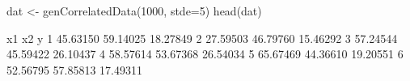 \begin{Schunk}
\begin{Sinput}
 dat <- genCorrelatedData(1000, stde=5)
 head(dat)
\end{Sinput}
\begin{Soutput}
        x1       x2        y
1 45.63150 59.14025 18.27849
2 27.59503 46.79760 15.46292
3 57.24544 45.59422 26.10437
4 58.57614 53.67368 26.54034
5 65.67469 44.36610 19.20551
6 52.56795 57.85813 17.49311
\end{Soutput}
\end{Schunk}
